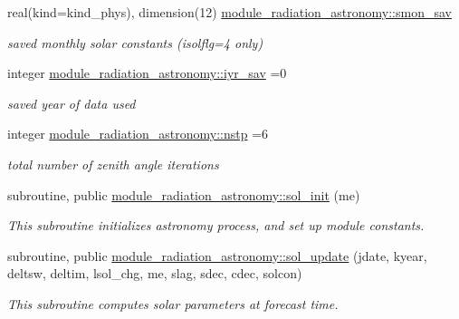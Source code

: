 \begin{DoxyCompactItemize}
\mbox{\label{group__module__radiation__astronomy_gab68b4488022a4c6340cb60dca3feff6a}} 
real(kind=kind\+\_\+phys), dimension(12) \hyperlink{group__module__radiation__astronomy_gab68b4488022a4c6340cb60dca3feff6a}{module\+\_\+radiation\+\_\+astronomy\+::smon\+\_\+sav}
\begin{DoxyCompactList}\small\item\em saved monthly solar constants (isolflg=4 only) \end{DoxyCompactList}\item 
\mbox{\label{group__module__radiation__astronomy_ga83370fbee96388e545a89eb25ed6df90}} 
integer \hyperlink{group__module__radiation__astronomy_ga83370fbee96388e545a89eb25ed6df90}{module\+\_\+radiation\+\_\+astronomy\+::iyr\+\_\+sav} =0
\begin{DoxyCompactList}\small\item\em saved year of data used \end{DoxyCompactList}\item 
\mbox{\label{group__module__radiation__astronomy_gab93fe36440da3cc1f1d64cae2ec4c25b}} 
integer \hyperlink{group__module__radiation__astronomy_gab93fe36440da3cc1f1d64cae2ec4c25b}{module\+\_\+radiation\+\_\+astronomy\+::nstp} =6
\begin{DoxyCompactList}\small\item\em total number of zenith angle iterations \end{DoxyCompactList}\item 
subroutine, public \hyperlink{group__module__radiation__astronomy_gaa9eeb5462c1dbddb971cee28eb38ca47}{module\+\_\+radiation\+\_\+astronomy\+::sol\+\_\+init} (me)
\begin{DoxyCompactList}\small\item\em This subroutine initializes astronomy process, and set up module constants. \end{DoxyCompactList}\item 
subroutine, public \hyperlink{group__module__radiation__astronomy_ga095550b8122f922ad122db44aa262b15}{module\+\_\+radiation\+\_\+astronomy\+::sol\+\_\+update} (jdate, kyear, deltsw, deltim, lsol\+\_\+chg, me, slag, sdec, cdec, solcon)
\begin{DoxyCompactList}\small\item\em This subroutine computes solar parameters at forecast time. \end{DoxyCompactList}\item 

\end{DoxyCompactItemize}
